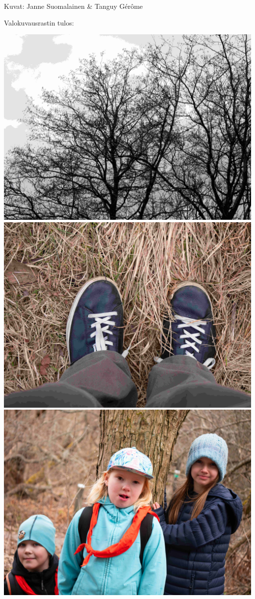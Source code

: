 \medskip
\noindent\null\hfill Kuvat: Janne Suomalainen \& Tanguy Gérôme
\vspace*{-0.64cm}

\clearpage

Valokuvausrastin tulos:

\begin{multicols}{2}

	\centering
	\noindent\includegraphics[width=0.9\linewidth]{assets/kolkkienpäiväretki4}
	\noindent\includegraphics[width=0.9\linewidth]{assets/kolkkienpäiväretki5}
	\noindent\includegraphics[width=0.9\linewidth]{assets/kolkkienpäiväretki6}

\end{multicols}
